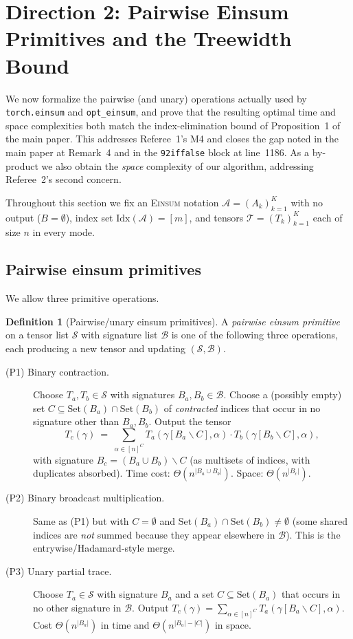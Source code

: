 \documentclass[11pt]{article}
\newcommand{\Einsum}{\textsc{Einsum}}
\newcommand{\calA}{\mathcal{A}}
\newcommand{\calB}{\mathcal{B}}
\newcommand{\calT}{\mathcal{T}}
\newcommand{\calS}{\mathcal{S}}
\newcommand{\takesetp}[1]{\mathrm{Set}(#1)}
\newcommand{\indexset}{\mathrm{Idx}}
\newcommand{\opteinsum}{\texttt{opt\_einsum}}
\newcommand{\torcheinsum}{\texttt{torch.einsum}}
\theoremstyle{plain}
\theoremstyle{definition}
\newtheorem{definition}[theorem]{Definition}
\begin{document}
\section{Direction 2: Pairwise Einsum Primitives and the Treewidth Bound}
\label{sec:pairwise}

We now formalize the pairwise (and unary) operations actually used by
\torcheinsum{} and \opteinsum{}, and prove that the resulting optimal time
and space complexities both match the index-elimination bound of Proposition~1
of the main paper.  This addresses Referee~1's M4 and closes the gap noted
in the main paper at Remark~4 and in the \texttt{\char92iffalse} block at
line~1186.  As a by-product we also obtain the \emph{space} complexity of
our algorithm, addressing Referee~2's second concern.

Throughout this section we fix an \Einsum{} notation $\calA=(A_k)_{k=1}^K$
with no output ($B=\emptyset$), index set $\indexset(\calA)=[m]$, and tensors
$\calT=(T_k)_{k=1}^K$ each of size $n$ in every mode.

\subsection{Pairwise einsum primitives}

We allow three primitive operations.

\begin{definition}[Pairwise/unary einsum primitives]
\label{def:primitives}
A \emph{pairwise einsum primitive} on a tensor list $\calS$ with signature
list $\calB$ is one of the following three operations, each producing a
new tensor and updating $(\calS,\calB)$.
\begin{description}
\item[(P1) Binary contraction.]  Choose $T_a,T_b\in\calS$ with signatures
$B_a,B_b\in\calB$.  Choose a (possibly empty) set $C\subseteq
\takesetp{B_a}\cap\takesetp{B_b}$ of \emph{contracted} indices that occur
in no signature other than $B_a,B_b$.  Output the tensor
\[
   T_c(\gamma)\ =\ \sum_{\alpha\in[n]^C}
      T_a(\gamma[B_a\backslash C],\alpha) \cdot T_b(\gamma[B_b\backslash C],\alpha),
\]
with signature $B_c=(B_a\cup B_b)\backslash C$ (as multisets of indices, with
duplicates absorbed).  Time cost: $\Theta(n^{|B_a\cup B_b|})$.  Space:
$\Theta(n^{|B_c|})$.
\item[(P2) Binary broadcast multiplication.]  Same as (P1) but with
$C=\emptyset$ and $\takesetp{B_a}\cap\takesetp{B_b}\neq\emptyset$ (some
shared indices are \emph{not} summed because they appear elsewhere in
$\calB$).  This is the entrywise/Hadamard-style merge.
\item[(P3) Unary partial trace.]  Choose $T_a\in\calS$ with signature $B_a$
and a set $C\subseteq\takesetp{B_a}$ that occurs in no other signature in
$\calB$.  Output
\(
   T_c(\gamma)=\sum_{\alpha\in[n]^C} T_a(\gamma[B_a\backslash C],\alpha).
\)
Cost $\Theta(n^{|B_a|})$ in time and $\Theta(n^{|B_a|-|C|})$ in space.
\end{description}
\end{definition}
\end{document}
